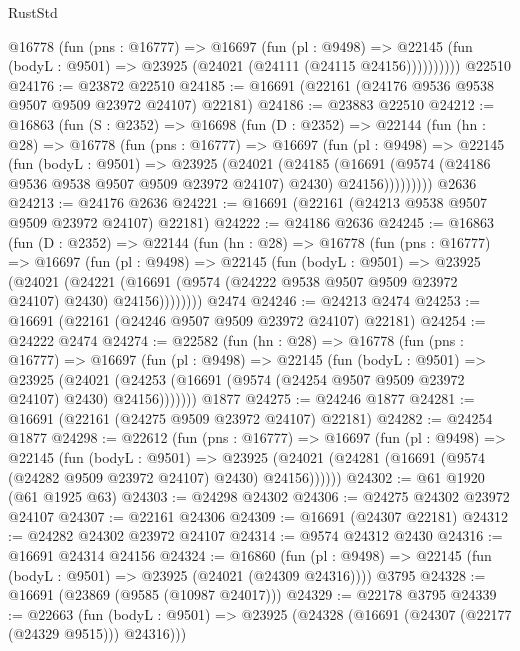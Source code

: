 \begin{lexlean}{RustStd}
\begin{coremodule}
          @16778
            (fun (pns : @16777) =>
            @16697
              (fun (pl : @9498) =>
              @22145 (fun (bodyL : @9501) => @23925 (@24021 (@24111 (@24115 @24156))))))))))
    @22510
@24176 := @23872 @22510
@24185 := @16691 (@22161 (@24176 @9536 @9538 @9507 @9509 @23972 @24107) @22181)
@24186 := @23883 @22510
@24212 := @16863
    (fun (S : @2352) =>
    @16698
      (fun (D : @2352) =>
      @22144
        (fun (hn : @28) =>
        @16778
          (fun (pns : @16777) =>
          @16697
            (fun (pl : @9498) =>
            @22145
              (fun (bodyL : @9501) =>
              @23925
                (@24021
                  (@24185
                    (@16691
                      (@9574 (@24186 @9536 @9538 @9507 @9509 @23972 @24107) @2430)
                      @24156)))))))))
    @2636
@24213 := @24176 @2636
@24221 := @16691 (@22161 (@24213 @9538 @9507 @9509 @23972 @24107) @22181)
@24222 := @24186 @2636
@24245 := @16863
    (fun (D : @2352) =>
    @22144
      (fun (hn : @28) =>
      @16778
        (fun (pns : @16777) =>
        @16697
          (fun (pl : @9498) =>
          @22145
            (fun (bodyL : @9501) =>
            @23925
              (@24021
                (@24221
                  (@16691 (@9574 (@24222 @9538 @9507 @9509 @23972 @24107) @2430) @24156))))))))
    @2474
@24246 := @24213 @2474
@24253 := @16691 (@22161 (@24246 @9507 @9509 @23972 @24107) @22181)
@24254 := @24222 @2474
@24274 := @22582
    (fun (hn : @28) =>
    @16778
      (fun (pns : @16777) =>
      @16697
        (fun (pl : @9498) =>
        @22145
          (fun (bodyL : @9501) =>
          @23925
            (@24021 (@24253 (@16691 (@9574 (@24254 @9507 @9509 @23972 @24107) @2430) @24156)))))))
    @1877
@24275 := @24246 @1877
@24281 := @16691 (@22161 (@24275 @9509 @23972 @24107) @22181)
@24282 := @24254 @1877
@24298 := @22612
    (fun (pns : @16777) =>
    @16697
      (fun (pl : @9498) =>
      @22145
        (fun (bodyL : @9501) =>
        @23925 (@24021 (@24281 (@16691 (@9574 (@24282 @9509 @23972 @24107) @2430) @24156))))))
@24302 := @61 @1920 (@61 @1925 @63)
@24303 := @24298 @24302
@24306 := @24275 @24302 @23972 @24107
@24307 := @22161 @24306
@24309 := @16691 (@24307 @22181)
@24312 := @24282 @24302 @23972 @24107
@24314 := @9574 @24312 @2430
@24316 := @16691 @24314 @24156
@24324 := @16860
    (fun (pl : @9498) => @22145 (fun (bodyL : @9501) => @23925 (@24021 (@24309 @24316))))
    @3795
@24328 := @16691 (@23869 (@9585 (@10987 @24017)))
@24329 := @22178 @3795
@24339 := @22663
    (fun (bodyL : @9501) => @23925 (@24328 (@16691 (@24307 (@22177 (@24329 @9515))) @24316)))

\end{coremodule}
\end{lexlean}
